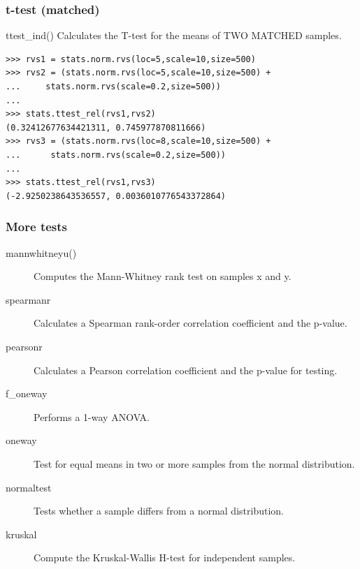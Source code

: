 \documentclass[10pt,colorlinks]{beamer}
\begin{document}
\begin{frame}[fragile]\frametitle{t-test (matched)}
  \begin{block}{ttest\_ind()}
Calculates the T-test for the means of TWO MATCHED samples. 
  \end{block}
{ \small
\begin{verbatim}
>>> rvs1 = stats.norm.rvs(loc=5,scale=10,size=500)
>>> rvs2 = (stats.norm.rvs(loc=5,scale=10,size=500) +
...     stats.norm.rvs(scale=0.2,size=500))
... 
>>> stats.ttest_rel(rvs1,rvs2)
(0.32412677634421311, 0.745977870811666)
>>> rvs3 = (stats.norm.rvs(loc=8,scale=10,size=500) +
...      stats.norm.rvs(scale=0.2,size=500))
... 
>>> stats.ttest_rel(rvs1,rvs3)
(-2.9250238643536557, 0.0036010776543372864)
\end{verbatim}

}
\end{frame}

\begin{frame}[fragile]\frametitle{More tests}
  \begin{description}
      \item[mannwhitneyu()] Computes the Mann-Whitney rank test on samples x and y.
    \item[spearmanr] Calculates a Spearman rank-order correlation coefficient and the p-value.
    \item[pearsonr] Calculates a Pearson correlation coefficient and the p-value for testing.
    \item[f\_oneway] Performs a 1-way ANOVA.
    \item[oneway] Test for equal means in two or more samples from the normal distribution.
    \item[normaltest] Tests whether a sample differs from a normal distribution.
    \item[kruskal] Compute the Kruskal-Wallis H-test for independent samples.
  \end{description}
\end{frame}
\end{document}
